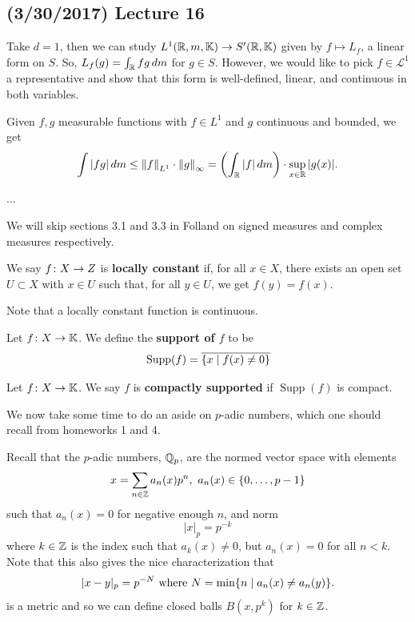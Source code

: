 \documentclass[11pt,leqno,oneside]{amsbook}
\numberwithin{thm}{section}
\newcommand{\cL}{\mathcal{L}}
\newcommand{\K}{\mathbb{K}} %
\newcommand{\supp}{\operatorname{Supp}}
\renewcommand{\de}{\textbf} %
\begin{document}
\subsection*{(3/30/2017) Lecture 16}
Take \(d=1\), then we can study \(L^1(\R,m,\K) \to S'(\R,\K)\) given
by \(f \mapsto L_f\), a linear form on \(S\). So, \(L_f(g) = \int_\R
fg \d m\) for \(g \in S\). However, we would like to pick \(f \in
\cL^1\) a representative and show that this form is well-defined, linear,
and continuous in both variables.
\begin{prop}\label{L1-Linf-bound-1}
  Given \(f,g\) measurable functions with \(f \in L^1\) and \(g\)
  continuous and bounded, we get \[
    \int |fg| \d m \leq \norm[f]_{L^1} \cdot \norm[g]_\infty =
    \left(\int_\R |f| \d m\right) \cdot \sup_{x \in \R} |g(x)|.
  \]
\end{prop}
...
\begin{rmk}
  We will skip sections 3.1 and 3.3 in Folland on signed measures and
  complex measures respectively.
\end{rmk}
\begin{defn}
  We say \(f \from X \to Z\) is \de{locally constant} if, for all \(x \in
  X\), there exists an open set \(U \subset X\) with \(x \in U\) such
  that, for all \(y \in U\), we get \(f(y) = f(x)\).
\end{defn}
Note that a locally constant function is continuous.
\begin{defn}
  Let \(f \from X \to \K\). We define the \de{support of \(f\)} to
  be \[
    \supp(f) = \ov{\{x \st f(x) \neq 0\}}
  \]
\end{defn}
\begin{defn}
  Let \(f \from X \to \K\). We say \(f\) is \de{compactly supported}
  if \(\supp(f)\) is compact.
\end{defn}
We now take some time to do an aside on \(p\)-adic numbers, which one
should recall from homeworks 1 and 4.
\begin{defn}
  Recall that the \(p\)-adic numbers, \(\Q_p\), are the normed vector
  space with elements \[
    x = \sum_{n \in \Z} a_n(x) p^n, \ a_n(x) \in \{0, \ldots, p-1\}
  \]
  such that \(a_n(x) = 0\) for negative enough \(n\), and norm \[
    |x|_p = p^{-k}
  \]
  where \(k \in \Z\) is the index such that \(a_k(x) \neq 0\), but
  \(a_n(x) = 0\) for all \(n < k\). Note that this also gives the nice
  characterization that \[
    |x-y|_p = p^{-N} \text{ where } N = \min\{n \st a_n(x) \neq a_n(y)\}.
  \]
  is a metric and so we can define closed balls \(B(x,p^k)\) for \(k
  \in \Z\).
\end{defn}
\end{document}
